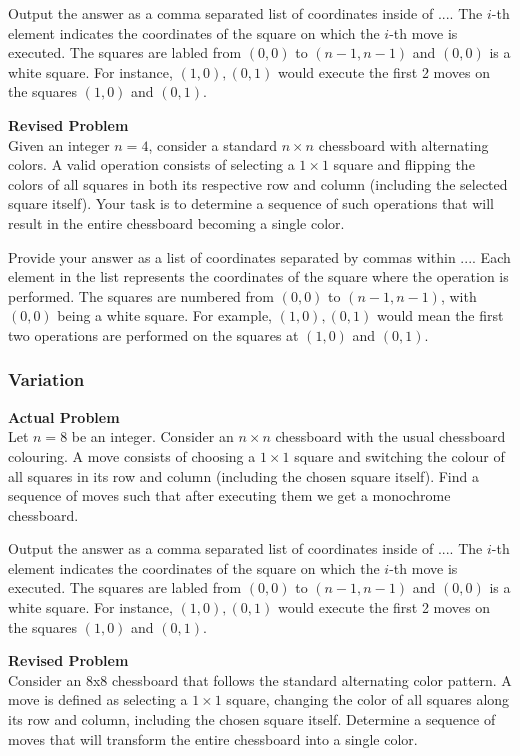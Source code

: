 Output the answer as a comma separated list of coordinates inside of $\boxed{...}$. The $i$-th element indicates the coordinates of the square on which the $i$-th move is executed. The squares are labled from $(0,0)$ to $(n-1,n-1)$ and $(0,0)$ is a white square. For instance, $\boxed{(1,0),(0,1)}$ would execute the first 2 moves on the squares $(1,0)$ and $(0,1)$.

\textbf{Revised Problem}\\
Given an integer $n = 4$, consider a standard $n \times n$ chessboard with alternating colors. A valid operation consists of selecting a $1 \times 1$ square and flipping the colors of all squares in both its respective row and column (including the selected square itself). Your task is to determine a sequence of such operations that will result in the entire chessboard becoming a single color.

Provide your answer as a list of coordinates separated by commas within $\boxed{...}$. Each element in the list represents the coordinates of the square where the operation is performed. The squares are numbered from $(0,0)$ to $(n-1,n-1)$, with $(0,0)$ being a white square. For example, $\boxed{(1,0),(0,1)}$ would mean the first two operations are performed on the squares at $(1,0)$ and $(0,1)$.

\subsubsection{Variation}
\textbf{Actual Problem}\\
Let $n = 8$ be an integer. Consider an $n \times n$ chessboard with the usual chessboard colouring. A move consists of choosing a $1 \times 1$ square and switching the colour of all squares in its row and column (including the chosen square itself). Find a sequence of moves such that after executing them we get a monochrome chessboard.

Output the answer as a comma separated list of coordinates inside of $\boxed{...}$. The $i$-th element indicates the coordinates of the square on which the $i$-th move is executed. The squares are labled from $(0,0)$ to $(n-1,n-1)$ and $(0,0)$ is a white square. For instance, $\boxed{(1,0),(0,1)}$ would execute the first 2 moves on the squares $(1,0)$ and $(0,1)$.

\textbf{Revised Problem}\\
Consider an 8x8 chessboard that follows the standard alternating color pattern. A move is defined as selecting a $1 \times 1$ square, changing the color of all squares along its row and column, including the chosen square itself. Determine a sequence of moves that will transform the entire chessboard into a single color.

